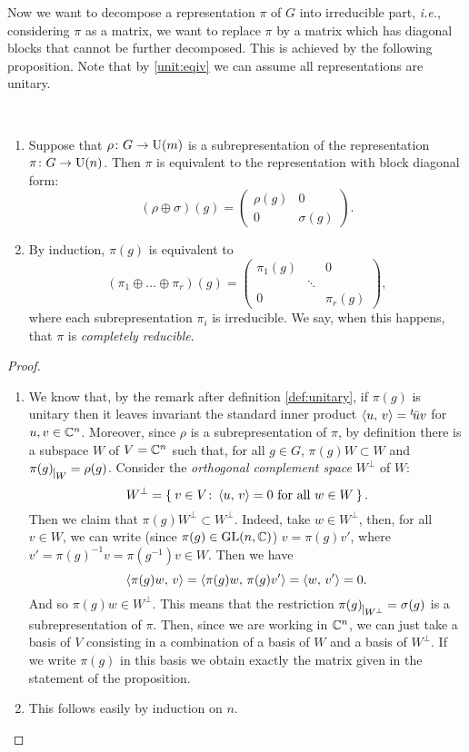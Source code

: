 Now we want to decompose a representation $\pi$ of $G$ into irreducible part, \textit{i.e.}, considering $\pi$ as a matrix, we want to replace $\pi$ by a matrix which has diagonal blocks that cannot be further decomposed. This is achieved by the following proposition.
Note that by \ref{unit:eqiv} we can assume all representations are unitary.
\begin{prop}~ 
\label{thm:complred}
\begin{enumerate}
\item Suppose that $\rho\colon G\rightarrow \operatorname{U}(m)$ is a subrepresentation of the representation $\pi\colon G\rightarrow \operatorname{U}(n)$. Then $\pi$ is equivalent to the representation with block diagonal form:
\[(\rho \oplus \sigma)(g)=
\begin{pmatrix}
\rho(g) & 0 \\
0 		& \sigma(g)
\end{pmatrix}.
\]
\item By induction, $\pi(g)$ is equivalent to
\[
(\pi_1\oplus\dots \oplus \pi_r)(g)= 
\begin{pmatrix}
\pi_1(g)  &{} &0\\
{} &\ddots &{} \\
0 &{}  &\pi_r(g)
\end{pmatrix},
\]
where each subrepresentation $\pi_i$  is irreducible. We say, when this happens, that $\pi$ is \emph{completely reducible}. 
\end{enumerate}
\end{prop}
\begin{proof}~ 
\begin{enumerate}
\item We know that, by the remark after definition \ref{def:unitary}, if $\pi(g)$ is unitary then it leaves invariant the standard inner product $\braket{u,\, v}={}^t\!\bar{u}v$ for $u,v \in {\mathbb C}^n$. Moreover, since $\rho$ is a subrepresentation of $\pi$, by definition there is a subspace $W$ of $V={\mathbb C}^n$ such that, for all $g\in G$, $\pi(g)W\subset W$ and $\pi(g)_{\mkern 1mu \vrule height 2ex\mkern2mu W}= \rho(g)$.  Consider the \emph{orthogonal complement space} $W^\perp$ of $W$:
\[
W^{\perp}= \Set{v \in V \colon \braket{u, \, v}=0 \text{ for all } w \in W}.
\]
Then we claim that $\pi(g)W^{\perp}\subset W^{\perp}$. Indeed, take $w\in W^{\perp}$, then, for all $v\in W$, we can write (since $\pi(g) \in \operatorname{GL}(n,{\mathbb C})$) $v=\pi(g)v'$, where $v'=\pi(g)^{-1}v=\pi(g^{-1})v \in W$. Then we have 
\[
\braket{\pi(g)w,\, v}=\braket{\pi(g)w,\, \pi(g)v'}=\braket{w,\, v'}=0.
\]
And so $\pi(g)w\in W^{\perp}$. This means that the restriction $\pi(g)_{\mkern 1mu \vrule height 2ex\mkern2mu W^{\perp}}= \sigma(g)$ is a subrepresentation of $\pi$.  Then, since we are working in ${\mathbb C}^n$, we can just take a basis of $V$ consisting in a combination of a basis of $W$ and a basis of $W^{\perp}$. If we write $\pi(g)$ in this basis we obtain exactly the matrix given in the statement of the proposition.
\item This follows easily by induction on $n$.
\end{enumerate}
\end{proof}

